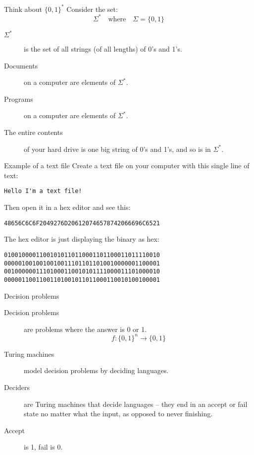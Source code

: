 \begin{frame}{Think about $\{0,1\}^*$}
  Consider the set:
  \[ \Sigma^* \quad \textrm{where} \quad \Sigma = \{0,1\} \]
  \vspace{1mm}
  \begin{description}
    \item[$\Sigma^*$]  is the set of all strings (of all lengths) of 0's and 1's.
    \item[Documents] on a computer are elements of $\Sigma^*$.
    \item[Programs] on a computer are elements of $\Sigma^*$.
    \item[The entire contents] of your hard drive is one big string of 0's and 1's, and so is in $\Sigma^*$.
  \end{description}
\end{frame}

\begin{frame}[fragile]{Example of a text file}
Create a text file on your computer with this single line of text:
  \begin{verbatim}
Hello I'm a text file!
  \end{verbatim}
  Then open it in a hex editor and see this:
  \begin{verbatim}
48656C6C6F2049276D206120746578742066696C6521
  \end{verbatim}
  The hex editor is just displaying the binary as hex:
  \begin{verbatim}
01001000011001010110110001101100011011110010
00000100100100100111011011010010000001100001
00100000011101000110010101111000011101000010
00000110011001101001011011000110010100100001
  \end{verbatim}
\end{frame}


\begin{frame}{Decision problems}
  \begin{description}
    \item[Decision problems] are problems where the answer is 0 or 1.
    \[ f:\{0,1\}^n \rightarrow \{0,1\} \]
    \item[Turing machines] model decision problems by deciding languages.
    \vspace{0.1cm}
    \item[Deciders] are Turing machines that decide languages -- they end in an accept or fail state no matter what the input, as opposed to never finishing.
    \vspace{0.1cm}
    \item[Accept] is 1, fail is 0.
  \end{description}
\end{frame}


